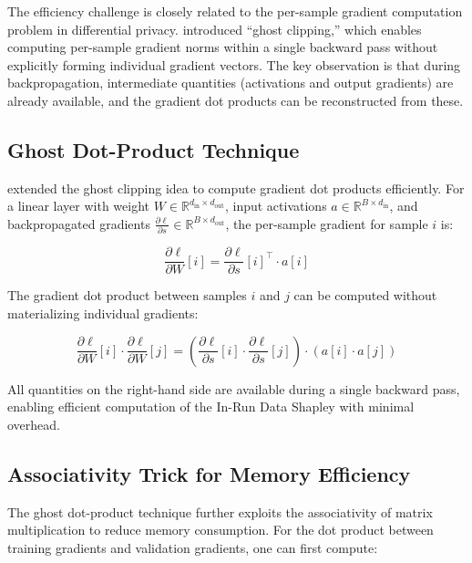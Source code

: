 \documentclass[12pt,a4paper]{report}
\begin{document}
The efficiency challenge is closely related to the per-sample gradient computation problem in differential privacy. \citet{lee2021concentrated} introduced ``ghost clipping,'' which enables computing per-sample gradient norms within a single backward pass without explicitly forming individual gradient vectors. The key observation is that during backpropagation, intermediate quantities (activations and output gradients) are already available, and the gradient dot products can be reconstructed from these.

\subsection{Ghost Dot-Product Technique}
\label{sec:ghost_dot}

\citet{wang2025data} extended the ghost clipping idea to compute gradient dot products efficiently. For a linear layer with weight $W \in \mathbb{R}^{d_{\text{in}} \times d_{\text{out}}}$, input activations $a \in \mathbb{R}^{B \times d_{\text{in}}}$, and backpropagated gradients $\frac{\partial \ell}{\partial s} \in \mathbb{R}^{B \times d_{\text{out}}}$, the per-sample gradient for sample $i$ is:

\begin{equation}
    \frac{\partial \ell}{\partial W}[i] = \frac{\partial \ell}{\partial s}[i]^\top \cdot a[i]
    \label{eq:per_sample_grad}
\end{equation}

The gradient dot product between samples $i$ and $j$ can be computed without materializing individual gradients:

\begin{equation}
    \frac{\partial \ell}{\partial W}[i] \cdot \frac{\partial \ell}{\partial W}[j] = \left(\frac{\partial \ell}{\partial s}[i] \cdot \frac{\partial \ell}{\partial s}[j]\right) \cdot \left(a[i] \cdot a[j]\right)
    \label{eq:ghost_dot_product}
\end{equation}

All quantities on the right-hand side are available during a single backward pass, enabling efficient computation of the In-Run Data Shapley with minimal overhead.

\subsection{Associativity Trick for Memory Efficiency}
\label{sec:associativity}

The ghost dot-product technique further exploits the associativity of matrix multiplication to reduce memory consumption. For the dot product between training gradients and validation gradients, one can first compute:
\end{document}
